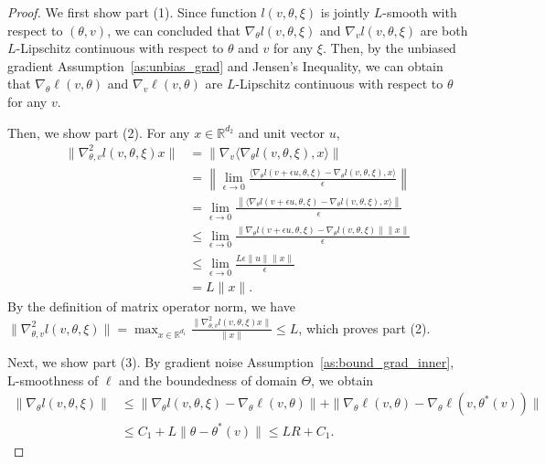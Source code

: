 \documentclass[11 pt]{article}
\begin{document}
\begin{proof}
    We first show part (1). Since function $ l(v,\theta,\xi)$ is jointly $L$-smooth with respect to $(\theta, v)$, we can concluded that $\nabla_\theta l(v,\theta,\xi)$ and $\nabla_v l(v,\theta,\xi)$ are both $L$-Lipschitz continuous with respect to $\theta$ and $v$ for any $\xi$. Then, by the unbiased gradient Assumption~\ref{as:unbias_grad} and Jensen's Inequality, we can obtain that $\nabla_\theta \ell(v,\theta)$ and $\nabla_v \ell(v,\theta)$ are $L$-Lipschitz continuous with respect to $\theta$ for any $v$.

    Then, we show part (2). For any $x \in \mathbb{R}^{d_2}$ and unit vector $u$,
    \begin{align*}
        \| \nabla_{\theta,v}^2l(v,\theta,\xi)x \|&=\| \nabla_v\langle\nabla_\theta l(v,\theta,\xi),x\rangle \|\\
        &=\left\| \lim_{\epsilon \to 0} \frac{\langle\nabla_\theta l(v+\epsilon u,\theta,\xi)-\nabla_\theta l(v,\theta,\xi),x\rangle}{\epsilon} \right \| \\
        &= \lim_{\epsilon \to 0}   \frac{\left\|\langle \nabla_\theta l(v+\epsilon u,\theta,\xi)-\nabla_\theta l(v,\theta,\xi), x\rangle \right \|}{\epsilon} \\
        & \leq \lim_{\epsilon \to 0}   \frac{\left\| \nabla_\theta l(v+\epsilon u,\theta,\xi)-\nabla_\theta l(v,\theta,\xi)\right\| \left\|x \right \|}{\epsilon} \tag{Cauchy–Schwarz Inequality} \\
        & {\leq} \lim_{\epsilon \to 0}   \frac{L\epsilon \|u\| \left\|x \right \|}{\epsilon} \tag{L-Lipschitz continuity  of $\nabla_\theta l$ in $\theta$}\\
        &= L\|x\|.
    \end{align*}
    By the definition of matrix operator norm, we have $\displaystyle \| \nabla_{\theta,v}^2l(v,\theta,\xi) \|= \max_{x\in \mathbb{R}^{d_1}} \frac{\| \nabla_{\theta,v}^2l(v,\theta,\xi)x \|}{\|x\|} \leq L$, 
    which proves part (2).

Next, we show part (3). By gradient noise Assumption~\ref{as:bound_grad_inner}, L-smoothness of $\ell$ and the boundedness of domain $\Theta$, we obtain 
    \begin{align*}
        \| \nabla_\theta l(v,\theta,\xi) \| 
        &\leq \| \nabla_\theta l(v,\theta,\xi)-\nabla_\theta \ell(v,\theta) \|+\| \nabla_\theta \ell(v,\theta) - \nabla_\theta \ell(v,\theta^*(v)) \| \\
        &\leq C_1+L\|\theta -\theta^*(v)\|   \leq LR+C_1.
    \end{align*}
    


\end{proof}
\end{document}
